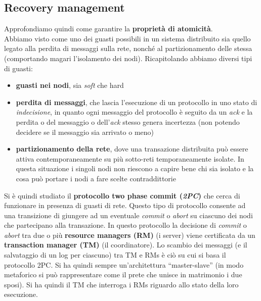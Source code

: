 \documentclass[a4paper,12pt, oneside]{book}
\begin{document}
\subsection{Recovery management}
Approfondiamo quindi come garantire la \textbf{proprietà di atomicità}.\\
Abbiamo visto come uno dei guasti possibili in un sistema distribuito sia quello
legato alla perdita di messaggi sulla rete, nonché al partizionamento delle
stessa (comportando magari l'isolamento dei nodi). Ricapitolando abbiamo diversi
tipi di guasti: 
\begin{itemize}
  \item \textbf{guasti nei nodi}, sia \textit{soft} che hard
  \item \textbf{perdita di messaggi}, che lascia l'esecuzione di un protocollo
  in uno stato di \textit{indecisione}, in quanto ogni messaggio del protocollo
  è seguito da un \textit{ack} e la perdita o del messaggio o dell'\textit{ack}
  stesso genera incertezza (non potendo decidere se il messaggio sia arrivato o
  meno)
  \item \textbf{partizionamento della rete}, dove una transazione distribuita
  può essere attiva contemporaneamente su più sotto-reti temporaneamente
  isolate. In questa situazione i singoli nodi non riescono a capire bene chi
  sia isolato e la cosa può portare i nodi a fare scelte contraddittorie
\end{itemize}
Si è quindi studiato il \textbf{protocollo two phase commit (\textit{2PC})} che
cerca di funzionare in presenza di guasti di rete. Questo tipo di protocollo
consente ad una transizione di giungere ad un eventuale \textit{commit} o
\textit{abort} su ciascuno dei nodi che partecipano alla transazione. In questo
protocollo la decisione di \textit{commit} o \textit{abort} tra due o più
\textbf{resource managers (RM)} (i server) viene certificata da un
\textbf{transaction manager (TM)} (il coordinatore). Lo scambio dei messaggi (e
il salvataggio di un log per ciascuno) tra TM e RMs è ciò su cui si basa il
protocollo 2PC. Si ha quindi sempre un'architettura ``master-slave'' (in modo
metaforico si può rappresentare come il prete che unisce in matrimonio i due
sposi). Si ha quindi il TM che interroga i RMs riguardo allo stato della loro
esecuzione.
\end{document}
